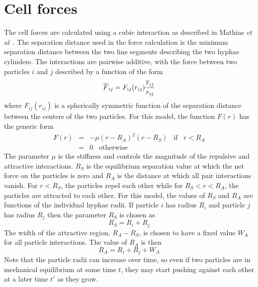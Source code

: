 \documentclass[12pt]{article}
\begin{document}
\section{Cell forces}
The cell forces are calculated using a cubic interaction as described in Mathias
{\em et al}~\cite{Mathias}. The separation distance used in the force
calculation is the minimum separation distance between the two line segments
describing the two hyphae cylinders. The interactions are pairwise
additive, with the force between two particles $i$ and $j$ described by a function of the form
\[
\overline{F}_{ij} = F_{ij}(r_{ij})\frac{\overline{r}_{ij}}{r_{ij}}
\]
where $F_{ij}(r_{ij})$ is a spherically symmetric function of the separation distance between the
centers of the two particles. For this model, the function $F(r)$ has the generic form
\begin{eqnarray*}
F(r) &=& -\mu(r-R_A)^2(r-R_S)\;\;\;\mbox{if}\;\;\;r<R_A \\
& = & 0\;\;\; \mbox{otherwise}
\end{eqnarray*}
The parameter $\mu$ is the stiffness and controls the magnitude of the repulsive and attractive
interactions. $R_S$ is the equilibrium separation value at which the net force on the particles is zero
and $R_A$ is the distance at which all pair interactions vanish. For $r<R_S$, the particles repel each
other while for $R_S<r<R_A$, the particles are attracted to each other. For this model, the values of
$R_S$ and $R_A$ are functions of the individual hyphae radii. If particle $i$ has radius $R_i$ and
particle $j$ has radius $R_j$ then the parameter $R_S$ is chosen as
\[
R_S = R_i+R_j
\]
The width of the attractive region, $R_A-R_S$, is chosen to have a fixed value $W_A$ for all particle
interactions. The value of $R_A$ is then
\[
R_A = R_i+R_j +W_A
\]
Note that the particle radii can increase over time, so even if two particles are in mechanical
equilibrium at some time $t$, they may start pushing against each other at a later time $t'$ as they
grow.
\end{document}
